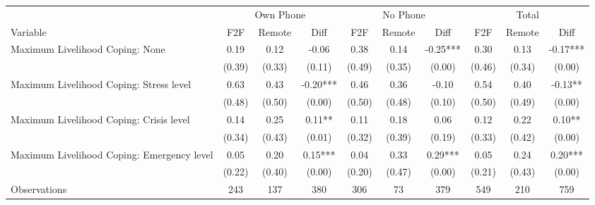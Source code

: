 \begin{tabular}{l*{9}c}
\hline\hline
 & \multicolumn{3}{c}{Own Phone} & \multicolumn{3}{c}{No Phone} & \multicolumn{3}{c}{Total}\\ 
Variable & F2F & Remote & Diff & F2F & Remote & Diff & F2F & Remote & Diff \\
\hline
Maximum Livelihood Coping: None&0.19&0.12&-0.06&0.38&0.14&-0.25***&0.30&0.13&-0.17***\\
&(0.39)&(0.33)&(0.11)&(0.49)&(0.35)&(0.00)&(0.46)&(0.34)&(0.00)\\
Maximum Livelihood Coping: Stress level&0.63&0.43&-0.20***&0.46&0.36&-0.10&0.54&0.40&-0.13**\\
&(0.48)&(0.50)&(0.00)&(0.50)&(0.48)&(0.10)&(0.50)&(0.49)&(0.00)\\
Maximum Livelihood Coping: Crisis level&0.14&0.25&0.11**&0.11&0.18&0.06&0.12&0.22&0.10**\\
&(0.34)&(0.43)&(0.01)&(0.32)&(0.39)&(0.19)&(0.33)&(0.42)&(0.00)\\
Maximum Livelihood Coping: Emergency level&0.05&0.20&0.15***&0.04&0.33&0.29***&0.05&0.24&0.20***\\
&(0.22)&(0.40)&(0.00)&(0.20)&(0.47)&(0.00)&(0.21)&(0.43)&(0.00)\\
\hline
Observations & 243 & 137 & 380 & 306 & 73 & 379 & 549 & 210 & 759 \\
\hline\hline
\end{tabular}
